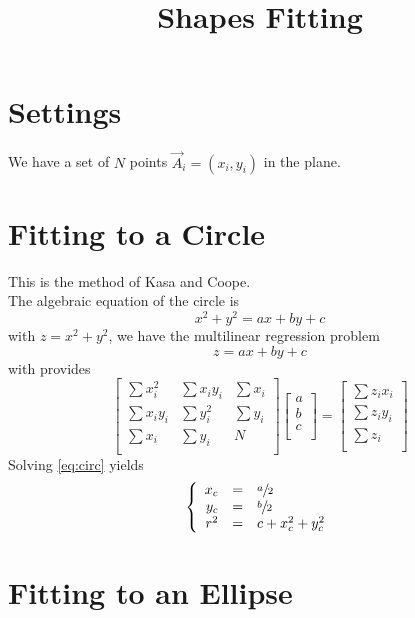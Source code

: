 \documentclass[aps]{revtex4}
\begin{document}
\title{Shapes Fitting}

\section{Settings}

We have a set of $N$ points $\vec{A}_i = (x_i,y_i)$ in the plane.

\section{Fitting to a Circle}
This is the method of Kasa and Coope.\\
The algebraic equation of the circle is
\begin{equation}
	x^2+y^2 = ax+by+c
\end{equation}
with $z = x^2+y^2$, we have the multilinear regression problem
\begin{equation}
	z = ax+by+c
\end{equation}
with provides
\begin{equation}
	\label{eq:circ}
	\begin{bmatrix}
	\sum x_i^2 & \sum x_iy_i & \sum x_i\\
	\sum x_iy_i & \sum y_i^2 & \sum y_i\\
	\sum x_i    & \sum y_i & N \\
	\end{bmatrix}
	\begin{bmatrix}
	a\\
	b\\
	c\\
	\end{bmatrix}
	=
	\begin{bmatrix}
	\sum z_i x_i\\
	\sum z_i y_i\\
	\sum z_i\\
	\end{bmatrix}
\end{equation}
Solving \eqref{eq:circ} yields
\begin{equation}
	\left\lbrace
	\begin{array}{rcl}
	x_c & = & \sfrac{a}{2}\\
	y_c & = & \sfrac{b}{2}\\
	r^2 & = & {c}+x_c^2+y_c^2\\
	\end{array}
	\right.
\end{equation}

\section{Fitting to an Ellipse}
\end{document}

